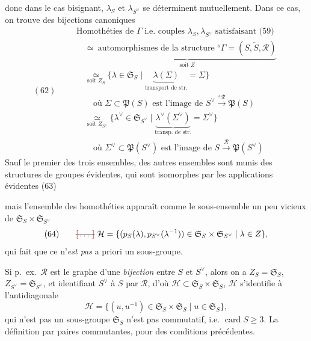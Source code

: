 \documentclass[11pt,a4paper]{article}
\begin{document}
donc dans le cas bisignant, $\lambda_S$ et $\lambda_{S^{\vee}}$ se
déterminent mutuellement. Dans ce cas, on trouve des bijections canoniques
\[
(62)\qquad
\begin{array}{l}
\text{Homothéties de } \Gamma \text{ i.e.\ couples } \lambda_S, \lambda_{S^{\vee}} \text{ satisfaisant (59)} \\
\quad \simeq\ \underbrace{\text{automorphismes de la structure } {}^{s}\Gamma = (S, \check{S}, \mathcal{R})}_{\text{soit } Z} \\[4pt]
\quad \underset{\text{soit } Z_S}{\simeq} \{\lambda \in \mathfrak{S}_S \mid \underbrace{\lambda(\Sigma)}_{\text{transport de str.}} = \Sigma\} \\
\qquad \text{où } \Sigma \subset \mathfrak{P}(S) \text{ est l'image de } S^{\vee} \xrightarrow{{}^{s}\mathcal{R}} \mathfrak{P}(S) \\[4pt]
\quad \underset{\text{soit } Z_{S^{\vee}}}{\simeq} \{\lambda^{\vee} \in \mathfrak{S}_{S^{\vee}} \mid \underbrace{\lambda^{\vee}(\Sigma^{\vee})}_{\text{transp. de str.}} = \Sigma^{\vee}\} \\
\qquad \text{où } \Sigma^{\vee} \subset \mathfrak{P}(S^{\vee}) \text{ est l'image de } S \xrightarrow{\mathcal{R}} \mathfrak{P}(S^{\vee})
\end{array}
\]
Sauf le premier des trois ensembles, des autres ensembles sont munis
des structures de groupes évidentes, qui sont isomorphes par les applications
évidentes (63)


mais l'ensemble des homothéties apparaît comme le sous-ensemble un peu
vicieux de $\mathfrak{S}_S \times \mathfrak{S}_{S^{\vee}}$
\[
(64)\qquad \text{\struck{\ill{}}}\ \mathcal{H} = \{(p_S(\lambda), p_{S^{\vee}}(\lambda^{-1})) \in \mathfrak{S}_S \times \mathfrak{S}_{S^{\vee}} \mid \lambda \in Z\},
\]
qui fait que ce n'\emph{est pas} a priori un sous-groupe.

Si p.\ ex.\ $\mathcal{R}$ est le graphe d'une \emph{bijection} entre $S$ et
$S^{\vee}$, alors on a $Z_S = \mathfrak{S}_S$, $Z_{S^{\vee}} = \mathfrak{S}_{S^{\vee}}$,
et identifiant $S^{\vee}$ à $S$ par $\mathcal{R}$, d'où
$\mathcal{H} \subset \mathfrak{S}_S \times \mathfrak{S}_S$,
$\mathcal{H}$ s'identifie à l'antidiagonale
\[
\mathcal{H} = \{(u, u^{-1}) \in \mathfrak{S}_S \times \mathfrak{S}_S \mid u \in \mathfrak{S}_S\},
\]
qui n'est pas un sous-groupe 
 $\mathfrak{S}_S$ n'est pas commutatif, i.e.
$\operatorname{card} S \geq 3$. La définition par
paires commutantes, pour  des conditions
 \ill{} précédentes.
\end{document}
